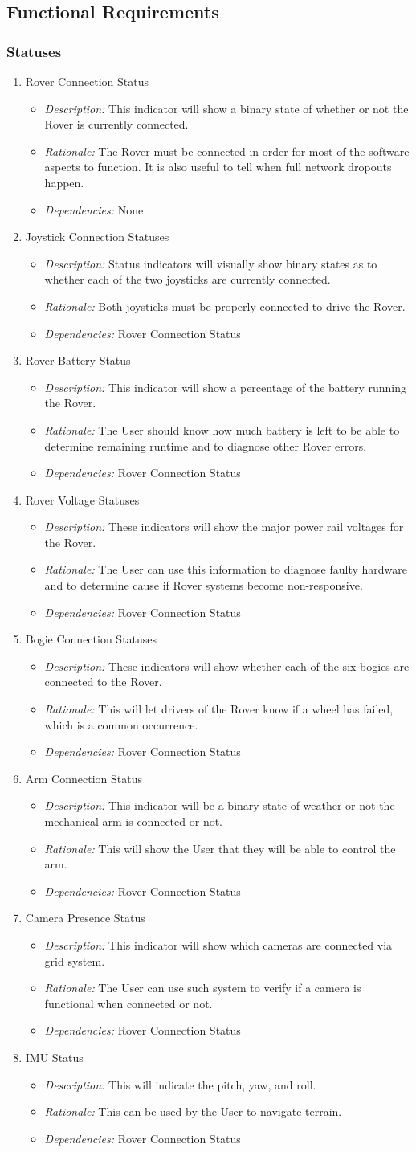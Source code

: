 \documentclass[onecolumn, draftclsnofoot, 10pt, compsoc]{IEEEtran}
\newcommand{\functRequ}[4]{
\item #1%
\par
\begin{itemize}
\item \textit{Description:} #2.%
\item \textit{Rationale:} #3.%
\item \textit{Dependencies:} #4%
\end{itemize}
}
\begin{document}
\subsection{Functional Requirements}
\subsubsection{Statuses}
\begin{enumerate}
\functRequ{Rover Connection Status}
{This indicator will show a binary state of whether or not the Rover is currently connected}
{The Rover must be connected in order for most of the software aspects to function. 
It is also useful to tell when full network dropouts happen}
{None}

\functRequ{Joystick Connection Statuses}
{Status indicators will visually show binary states as to whether each of the two joysticks are currently connected}
{Both joysticks must be properly connected to drive the Rover}
{Rover Connection Status}

\functRequ{Rover Battery Status}
{This indicator will show a percentage of the battery running the Rover}
{The User should know how much battery is left to be able to determine remaining runtime and to diagnose other Rover errors}
{Rover Connection Status}

\functRequ{Rover Voltage Statuses}
{These indicators will show the major power rail voltages for the Rover}
{The User can use this information to diagnose faulty hardware and to determine cause if Rover systems become non-responsive}
{Rover Connection Status}
  
\functRequ{Bogie Connection Statuses}
{These indicators will show whether each of the six bogies are connected to the Rover}
{This will let drivers of the Rover know if a wheel has failed, which is a common occurrence}
{Rover Connection Status}

\functRequ{Arm Connection Status}
{This indicator will be a binary state of weather or not the mechanical arm is connected or not}
{This will show the User that they will be able to control the arm}
{Rover Connection Status}

\functRequ{Camera Presence Status}
{This indicator will show which cameras are connected via grid system}
{The User can use such system to verify if a camera is functional when connected or not}
{Rover Connection Status}

\functRequ{IMU Status}
{This will indicate the pitch, yaw, and roll}
{This can be used by the User to navigate terrain}
{Rover Connection Status}


\end{enumerate}
\end{document}
